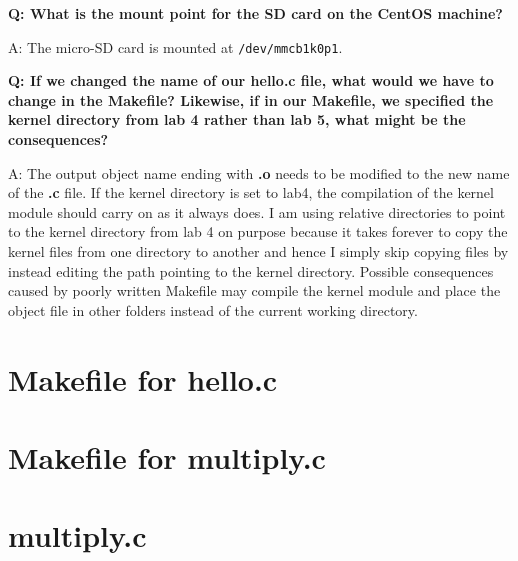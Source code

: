 \documentclass[11pt,letterpaper,titlepage]{article}
\begin{document}
\textbf{Q: What is the mount point for the SD card on the CentOS machine?}

A: The micro-SD card is mounted at \verb|/dev/mmcb1k0p1|.

\textbf{Q: If we changed the name of our hello.c file, what would we have to change in the Makefile? Likewise, if in our Makefile, we specified the kernel directory from lab 4 rather than lab 5, what
might be the consequences?}

A: The output object name ending with \textbf{.o} needs to be modified to the new name of the \textbf{.c} file. If the kernel directory is set to lab4, the compilation of the kernel module should carry on as it always does. I am using relative directories to point to the kernel directory from lab 4 on purpose because it takes forever to copy the kernel files from one directory to another and hence I simply skip copying files by instead editing the path pointing to the kernel directory. Possible consequences caused by poorly written Makefile may compile the kernel module and place the object file in other folders instead of the current working directory.

\newpage

\begin{appendices}

\end{appendices}

\section{Makefile for hello.c}
\label{appendix:makefile_hello}


\section{Makefile for multiply.c}
\label{appendix:makefile_multiply}


\section{multiply.c}
\label{appendix:sourcecode_multiply}

\end{document}
